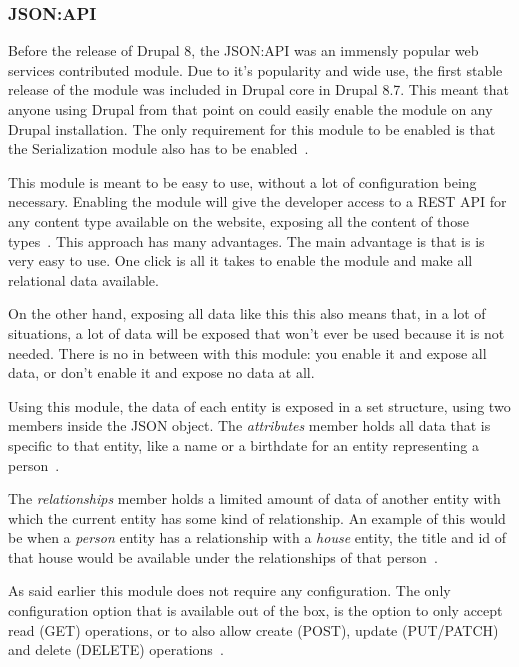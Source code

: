 \subsubsection{JSON:API}
\label{sss:JSONAPI}

Before the release of Drupal 8, the JSON:API was an immensly popular web services contributed module. Due to it's popularity and wide use, the first stable release of the module was included in Drupal core in Drupal 8.7. This meant that anyone using Drupal from that point on could easily enable the module on any Drupal installation. The only requirement for this module to be enabled is that the Serialization module also has to be enabled~\autocite{Drupal2019}.

This module is meant to be easy to use, without a lot of configuration being necessary. Enabling the module will give the developer access to a REST API for any content type available on the website, exposing all the content of those types~\autocite{So2018}. This approach has many advantages. The main advantage is that is is very easy to use. One click is all it takes to enable the module and make all relational data available.

On the other hand, exposing all data like this this also means that, in a lot of situations, a lot of data will be exposed that won't ever be used because it is not needed. There is no in between with this module: you enable it and expose all data, or don't enable it and expose no data at all.

Using this module, the data of each entity is exposed in a set structure, using two members inside the JSON object. The \emph{attributes} member holds all data that is specific to that entity, like a name or a birthdate for an entity representing a person~\autocite{Drupal2019}. 

The \emph{relationships} member holds a limited amount of data of another entity with which the current entity has some kind of relationship. An example of this would be when a \emph{person} entity has a relationship with a \emph{house} entity, the title and id of that house would be available under the relationships of that person~\autocite{Drupal2019}.

As said earlier this module does not require any configuration. The only configuration option that is available out of the box, is the option to only accept read (GET) operations, or to also allow create (POST), update (PUT/PATCH) and delete (DELETE) operations~\autocite{So2018}.


